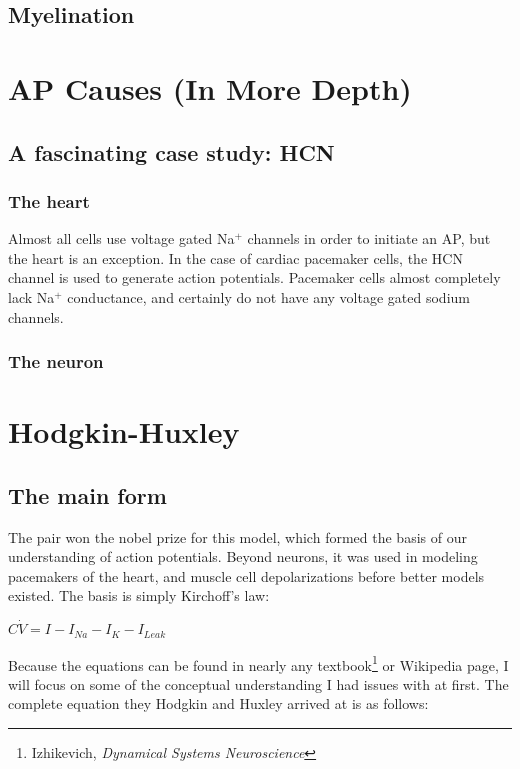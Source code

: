 \documentclass[12pt]{amsart}
\begin{document}
\subsection{Myelination}


\section{AP Causes (In More Depth)}
\subsection{A fascinating case study: HCN}
\subsubsection{The heart} Almost all cells use voltage gated Na$^+$ channels in order to initiate an AP, but the heart is an exception. In the case of cardiac pacemaker cells, the HCN channel is used to generate action potentials. Pacemaker cells almost completely lack Na$^+$ conductance, and certainly do not have any voltage gated sodium channels. 

\subsubsection{The neuron}

\section{Hodgkin-Huxley} 

\subsection{The main form} The pair won the nobel prize for this model, which formed the basis of our understanding of action potentials. Beyond neurons, it was used in modeling pacemakers of the heart, and muscle cell depolarizations before better models existed.  The basis is simply Kirchoff's law: 

\bigskip

\begin{center}

    $C\dot{V} = I - I_{Na} - I_{K} - I_{Leak}$
    
\end{center}

\bigskip

Because the equations can be found in nearly any textbook\footnote{Izhikevich, \textit{Dynamical Systems Neuroscience}} or Wikipedia page, I will focus on some of the conceptual understanding I had issues with at first. The complete equation they Hodgkin and Huxley arrived at is as follows: 
\end{document}
